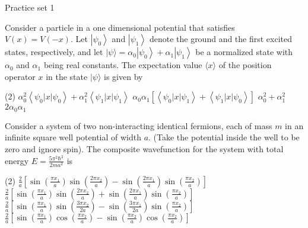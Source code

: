 \newpage
\begin{abox}
	Practice set 1
	\end{abox}
\begin{enumerate}
	\begin{minipage}{\textwidth}
		\item Consider a particle in a one dimensional potential that satisfies $V(x)=V(-x) .$ Let $\left|\psi_{0}\right\rangle$ and $\left|\psi_{1}\right\rangle$ denote the ground and the first excited states, respectively, and let $|\psi\rangle=\alpha_{0}\left|\psi_{0}\right\rangle+\alpha_{1}\left|\psi_{1}\right\rangle$ be a normalized state with $\alpha_{0}$ and $\alpha_{1}$ being real constants. The expectation value $\langle x\rangle$ of the position operator $x$ in the state $|\psi\rangle$ is given by
	\end{minipage}
	\begin{tasks}(2)
		\task[\textbf{A.}] $\alpha_{0}^{2}\left\langle\psi_{0}|x| \psi_{0}\right\rangle+\alpha_{1}^{2}\left\langle\psi_{1}|x| \psi_{1}\right\rangle$
		\task[\textbf{B.}]$\alpha_{0} \alpha_{1}\left[\left\langle\psi_{0}|x| \psi_{1}\right\rangle+\left\langle\psi_{1}|x| \psi_{0}\right\rangle\right]$
		\task[\textbf{C.}]$\alpha_{0}^{2}+\alpha_{1}^{2}$
		\task[\textbf{D.}]$2 \alpha_{0} \alpha_{1}$
	\end{tasks}
\begin{minipage}{\textwidth}
	\item Consider a system of two non-interacting identical fermions, each of mass $m$ in an infinite square well potential of width $a$. (Take the potential inside the well to be zero and ignore spin). The composite wavefunction for the system with total energy $E=\frac{5 \pi^{2} \hbar^{2}}{2 m a^{2}}$ is
\end{minipage}
\begin{tasks}(2)
	\task[\textbf{A.}] $\frac{2}{a}\left[\sin \left(\frac{\pi x_{1}}{a}\right) \sin \left(\frac{2 \pi x_{2}}{a}\right)-\sin \left(\frac{2 \pi x_{1}}{a}\right) \sin \left(\frac{\pi x_{2}}{a}\right)\right]$
	\task[\textbf{B.}]$\frac{2}{a}\left[\sin \left(\frac{\pi x_{1}}{a}\right) \sin \left(\frac{2 \pi x_{2}}{a}\right)+\sin \left(\frac{2 \pi x_{1}}{a}\right) \sin \left(\frac{\pi x_{2}}{a}\right)\right]$
	\task[\textbf{C.}]$\frac{2}{a}\left[\sin \left(\frac{\pi x_{1}}{a}\right) \sin \left(\frac{3 \pi x_{2}}{2 a}\right)-\sin \left(\frac{3 \pi x_{1}}{2 a}\right) \sin \left(\frac{\pi x_{2}}{a}\right)\right]$
	\task[\textbf{D.}]$\frac{2}{a}\left[\sin \left(\frac{\pi x_{1}}{a}\right) \cos \left(\frac{\pi x_{2}}{a}\right)-\sin \left(\frac{\pi x_{2}}{a}\right) \cos \left(\frac{\pi x_{2}}{a}\right)\right]$

\end{tasks}
\end{enumerate}
